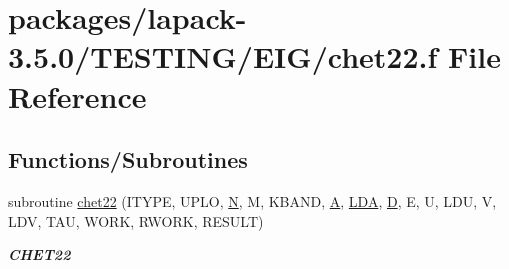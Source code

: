 \hypertarget{chet22_8f}{}\section{packages/lapack-\/3.5.0/\+T\+E\+S\+T\+I\+N\+G/\+E\+I\+G/chet22.f File Reference}
\label{chet22_8f}
\subsection*{Functions/\+Subroutines}
\begin{DoxyCompactItemize}
\item 
subroutine \hyperlink{group__complex__eig_ga0d76f9028abf55ff509d2fb0a58ed763}{chet22} (I\+T\+Y\+P\+E, U\+P\+L\+O, \hyperlink{polmisc_8c_a0240ac851181b84ac374872dc5434ee4}{N}, M, K\+B\+A\+N\+D, \hyperlink{classA}{A}, \hyperlink{example__user_8c_ae946da542ce0db94dced19b2ecefd1aa}{L\+D\+A}, \hyperlink{odrpack_8h_a7dae6ea403d00f3687f24a874e67d139}{D}, E, U, L\+D\+U, V, L\+D\+V, T\+A\+U, W\+O\+R\+K, R\+W\+O\+R\+K, R\+E\+S\+U\+L\+T)
\begin{DoxyCompactList}\small\item\em {\bfseries C\+H\+E\+T22} \end{DoxyCompactList}\end{DoxyCompactItemize}
